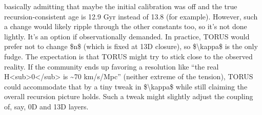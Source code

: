 \documentclass[
]{article}
\begin{document}
\begin{enumerate}
  basically admitting that maybe the initial calibration was off and the
  true recursion-consistent age is 12.9 Gyr instead of 13.8 (for
  example). However, such a change would likely ripple through the other
  constants too, so it's not done lightly. It's an option if
  observationally demanded. In practice, TORUS would prefer not to
  change \$n\$ (which is fixed at 13D closure), so
  \$\textbackslash kappa\$ is the only fudge. The expectation is that
  TORUS might try to stick close to the observed reality. If the
  community ends up favoring a resolution like ``the real
  H\textless sub\textgreater0\textless/sub\textgreater{} is
  \textasciitilde70 km/s/Mpc'' (neither extreme of the tension), TORUS
  could accommodate that by a tiny tweak in \$\textbackslash kappa\$
  while still claiming the overall recursion picture holds\hspace{0pt}.
  Such a tweak might slightly adjust the coupling of, say, 0D and 13D
  layers.
\end{enumerate}
\end{document}
